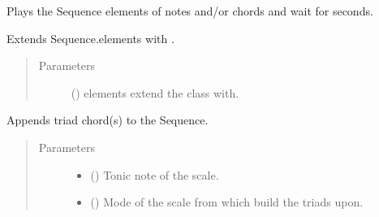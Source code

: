 \documentclass[letterpaper,10pt,english]{sphinxmanual}
\begin{document}
\begin{fulllineitems}
\begin{fulllineitems}
\end{fulllineitems}


\begin{fulllineitems}
\label{\detokenize{index:birdears.sequence.Sequence.async_play}}
Plays the Sequence elements of notes and/or chords and wait for
 seconds.

\end{fulllineitems}


\begin{fulllineitems}
\label{\detokenize{index:birdears.sequence.Sequence.extend}}
Extends Sequence.elements with .
\begin{quote}\begin{description}
\item[{Parameters}] \leavevmode
{} () \textendash{} elements extend the class with.

\end{description}\end{quote}

\end{fulllineitems}


\begin{fulllineitems}
\label{\detokenize{index:birdears.sequence.Sequence.make_chord_progression}}
Appends triad chord(s) to the Sequence.
\begin{quote}\begin{description}
\item[{Parameters}] \leavevmode\begin{itemize}
\item {} 
 () \textendash{} Tonic note of the scale.

\item {} 
 () \textendash{} Mode of the scale from which build the triads upon.


\end{itemize}
\end{description}
\end{quote}
\end{fulllineitems}
\end{fulllineitems}
\end{document}
